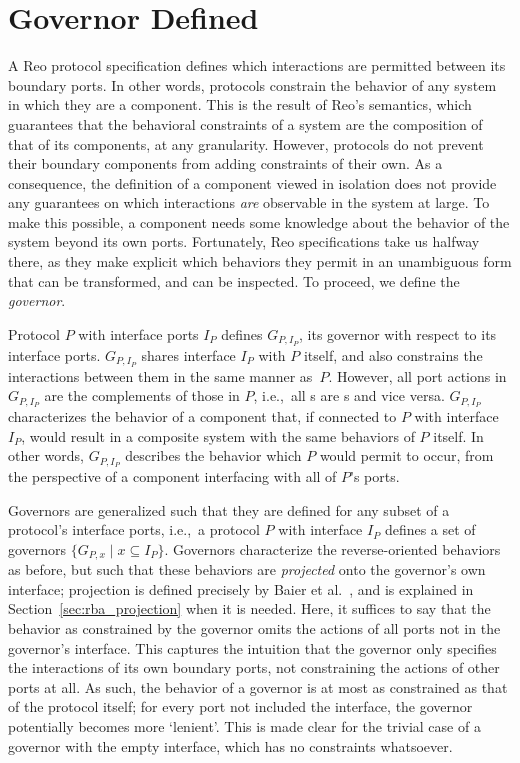 \section{Governor Defined}
\label{sec:governor_defined}
A Reo protocol specification defines which interactions are permitted between its boundary ports. In other words, protocols constrain the behavior of any system in which they are a component. This is the result of Reo's semantics, which 
guarantees that the behavioral constraints of a system are the composition of that of its components, at any granularity. However, protocols do not prevent their boundary components from adding constraints of their own. As a consequence, the definition of a component viewed in isolation does not provide any guarantees on which interactions \textit{are} observable in the system at large. To make this possible, a component needs some knowledge about the behavior of the system beyond its own ports. Fortunately, Reo specifications take us halfway there, as they make explicit which behaviors they permit in an unambiguous form that can be transformed, and can be inspected. To proceed, we define the \textit{governor}.

Protocol $P$ with interface ports $I_P$ defines $G_{P,I_P}$, its governor with respect to its interface ports. $G_{P,I_P}$ shares interface $I_P$ with $P$ itself, and also constrains the interactions between them in the same manner as~$P$. However, all port actions in $G_{P,I_P}$ are the complements of those in $P$, i.e.,\ all s are s and vice versa. $G_{P,I_P}$ characterizes the behavior of a component that, if connected to $P$ with interface $I_P$, would result in a composite system with the same behaviors of $P$ itself. In other words, $G_{P,I_P}$ describes the behavior which $P$ would permit to occur, from the perspective of a component interfacing with all of $P$'s ports.

Governors are generalized such that they are defined for any subset of a protocol's interface ports, i.e.,\ a protocol $P$ with interface $I_P$ defines a set of governors $\{G_{P,x} \; | \; x\subseteq I_P\}$. Governors characterize the reverse-oriented behaviors as before, but such that these behaviors are \textit{projected} onto the governor's own interface; projection is defined precisely by Baier et al.~\cite{baier2006modeling}, and is explained in Section~\ref{sec:rba_projection} when it is needed. Here, it suffices to say that the behavior as constrained by the governor omits the actions of all ports not in the governor's interface. This captures the intuition that the governor only specifies the interactions of its own boundary ports, not constraining the actions of other ports at all. As such, the behavior of a governor is at most as constrained as that of the protocol itself; for every port not included the interface, the governor potentially becomes more `lenient'. This is made clear for the trivial case of a governor with the empty interface, which has no constraints whatsoever.

